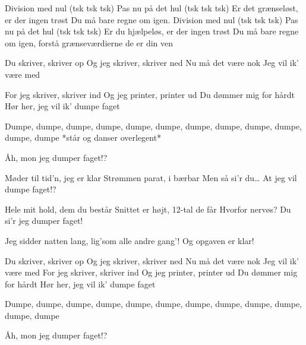 \documentclass[a4paper,11pt]{article}
\begin{document}
\begin{song}
 Division med nul (tsk tsk tsk) 
Pas nu på det hul (tsk tsk tsk) 
Er det grænseløst, er der ingen trøst 
Du må bare regne om igen. 
Division med nul (tsk tsk tsk) 
Pas nu på det hul (tsk tsk tsk) 
Er du hjælpeløs, er der ingen trøst 
Du må bare regne om igen, 
forstå grænseværdierne de er din ven


 Du skriver, skriver op 
Og jeg skriver, skriver ned 
Nu må det være nok 
Jeg vil ik’ være med 

For jeg skriver, skriver ind 
Og jeg printer, printer ud 
Du dømmer mig for hårdt 
Hør her, jeg vil ik’ dumpe faget


 Dumpe, dumpe, dumpe, dumpe, dumpe, dumpe, dumpe, dumpe, dumpe, dumpe, dumpe, dumpe *står og danser overlegent*

 Åh, mon jeg dumper faget!? 

Møder til tid’n, jeg er klar 
Strømmen parat, i bærbar 
Men så si’r du… At jeg vil dumpe faget!? 

Hele mit hold, dem du består 
Snittet er højt, 12-tal de får 
Hvorfor nervøs? 
Du si’r jeg dumper faget! 

Jeg sidder natten lang, lig’som alle andre gang’! 
Og opgaven er klar!

 Du skriver, skriver op 
Og jeg skriver, skriver ned 
Nu må det være nok 
Jeg vil ik’ være med 
For jeg skriver, skriver ind 
Og jeg printer, printer ud 
Du dømmer mig for hårdt 
Hør her, jeg vil ik’ dumpe faget

 Dumpe, dumpe, dumpe, dumpe, dumpe, dumpe, dumpe, dumpe, dumpe, dumpe, dumpe, dumpe 

 Åh, mon jeg dumper faget!? 

\end{song}
\end{document}

